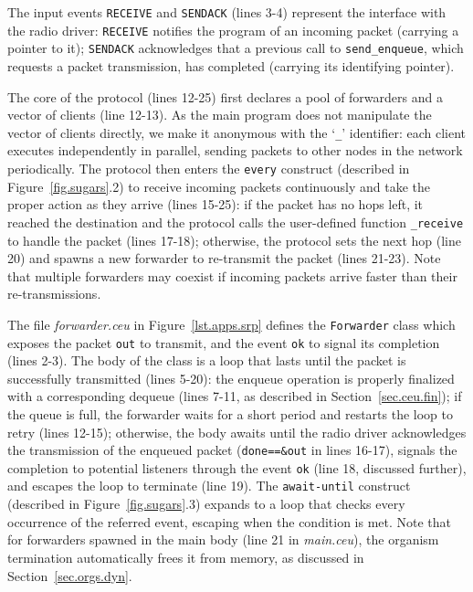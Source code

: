 \documentclass{sigplanconf}
\newcommand{\code}[1] {{\small{\texttt{#1}}}}
\newcommand{\1}{\;}
\newcommand{\2}{\;\;}
\newcommand{\3}{\;\;\;}
\newcommand{\5}{\;\;\;\;\;}
\begin{document}
The input events \code{RECEIVE} and \code{SENDACK} (lines 3-4) represent the 
interface with the radio driver:
\code{RECEIVE} notifies the program of an incoming packet (carrying a pointer 
to it);
\code{SENDACK} acknowledges that a previous call to \code{send\_enqueue}, which 
requests a packet transmission, has completed (carrying its identifying 
pointer).  

The core of the protocol (lines 12-25) first declares a pool of forwarders and 
a vector of clients (line 12-13).
%
As the main program does not manipulate the vector of clients directly, we make 
it anonymous with the `\code{\_}' identifier:
each client executes independently in parallel, sending packets to other nodes 
in the network periodically.
%
The protocol then enters the \code{every} construct (described in 
Figure~\ref{fig.sugars}.2) to receive incoming packets continuously and take 
the proper action as they arrive (lines 15-25):
if the packet has no hops left, it reached the destination and the protocol 
calls the user-defined function \code{\_receive} to handle the packet (lines 
17-18);
otherwise, the protocol sets the next hop (line 20) and spawns a new forwarder 
to re-transmit the packet (lines 21-23).
%
Note that multiple forwarders may coexist if incoming packets arrive faster 
than their re-transmissions.

The file \emph{forwarder.ceu} in Figure~\ref{lst.apps.srp} defines the 
\code{Forwarder} class which exposes the packet \code{out} to transmit, and the 
event \code{ok} to signal its completion (lines 2-3).
%
The body of the class is a loop that lasts until the packet is successfully 
transmitted (lines 5-20):
the enqueue operation is properly finalized with a corresponding dequeue (lines 
7-11, as described in Section~\ref{sec.ceu.fin});
if the queue is full, the forwarder waits for a short period and restarts the 
loop to retry (lines 12-15);
otherwise, the body awaits until the radio driver acknowledges the transmission 
of the enqueued packet (\code{done==\&out} in lines 16-17), signals the 
completion to potential listeners through the event \code{ok} (line 18, 
discussed further), and escapes the loop to terminate (line 19).
The \code{await-until} construct (described in Figure~\ref{fig.sugars}.3) 
expands to a loop that checks every occurrence of the referred event, escaping 
when the condition is met.
%
Note that for forwarders spawned in the main body (line 21 in \emph{main.ceu}), 
the organism termination automatically frees it from memory, as discussed in 
Section~\ref{sec.orgs.dyn}.
\end{document}
